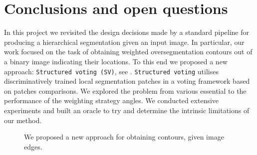 \chapter{Conclusions and open questions} %
\label{Chapter6}
In this project we revisited the design decisions made by a standard pipeline \cite{Arbelaez11} for producing a hierarchical segmentation given an input image. In particular, our work focused on the task of obtaining weighted oversegmentation contours out of a binary image indicating %
their locations. To this end we proposed a new approach: {\tt Structured voting (SV)}, see . {\tt Structured voting} utilises discriminatively trained local segmentation patches in a voting framework based on patches comparisons. 
We explored the problem from various essential to the performance of the weighting strategy angles. %
We conducted extensive experiments and built an oracle to try and determine %
the intrinsic limitations of our method.

\begin{figure}[t]
\centering
{}
\caption[From edges to contours: a new approach]{We proposed a new approach for obtaining contours, given image edges.}
\label{fig:weighting-oversegm-contours}
\end{figure}

